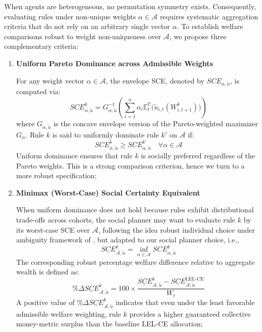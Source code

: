 \documentclass[11pt,a4paper]{article}
\theoremstyle{definition}
\theoremstyle{plain}
\theoremstyle{remark}
\newcommand{\E}{\mathbb{E}}
\renewcommand{\P}{\mathbb{P}}
\newcommand{\1}{\mathbf{1}}
\begin{document}
When agents are heterogeneous, no permutation symmetry exists. Consequently, evaluating rules under non-unique weights $\alpha \in \mathcal{A}$ requires systematic aggregation criteria that do not rely on an arbitrary single vector $\alpha$. To establish welfare comparisons robust to weight non-uniqueness over $\mathcal{A}$, we propose three complementary criteria:
\begin{enumerate}
    \item \textbf{Uniform Pareto Dominance across Admissible Weights}
    
    For any weight vector $\alpha \in \mathcal{A}$, the envelope SCE, denoted by $SCE_{\alpha, \tilde{u}}$, is computed via:
    \begin{equation*}
        SCE_{\alpha, \tilde{u}}^k = G_{\alpha, \tilde{u}}^{-1}\left( \sum_{i=1}^n \alpha_i \E_t^{\P}\big(\tilde{u}_{i,t}(W_{i,t+1}^k)\big) \right)
    \end{equation*}
    where $G_{\alpha, \tilde{u}}$ is the concave envelope version of the Pareto-weighted maximizer $G_{\alpha}$. Rule $k$ is said to uniformly dominate rule $k'$ on $\mathcal{A}$ if:
    \begin{equation*}
        SCE_{\alpha, \tilde{u}}^k \geq SCE_{\alpha, \tilde{u}}^{k'} \quad \forall \alpha \in \mathcal{A}
    \end{equation*}
    Uniform dominance ensures that rule $k$ is socially preferred regardless of the Pareto weights. This is a strong comparison criterion, hence we turn to a more robust specification;
    \item \textbf{Minimax (Worst-Case) Social Certainty Equivalent}
    
    When uniform dominance does not hold because rules exhibit distributional trade-offs across cohorts, the social planner may want to evaluate rule $k$ by its worst-case SCE over $\mathcal{A}$, following the idea robust individual choice under ambiguity framework of \citet{Gilboa_Schmeidler_1989_maxmin}, but adapted to our social planner choice, i.e.,
    \begin{equation}
        \underline{SCE}^{k}_{\mathcal{A}, \tilde{u}} = \inf_{\alpha \in \mathcal{A}} SCE_{\alpha, \tilde{u}}^k
    \end{equation}
    The corresponding robust percentage welfare difference relative to aggregate wealth is defined as:
    \begin{equation*}
        \% \Delta \underline{SCE}^{k}_{\mathcal{A}, \tilde{u}} = 100 \times \frac{\underline{SCE}^{k}_{\mathcal{A}, \tilde{u}} - \underline{SCE}^{\text{LEL-CE}}_{\mathcal{A}, \tilde{u}}}{W_t}
    \end{equation*}
    A positive value of $\% \Delta \underline{SCE}^{k}_{\mathcal{A}, \tilde{u}}$ indicates that even under the least favorable admissible welfare weighting, rule $k$ provides a higher guaranteed collective money-metric surplus than the baseline LEL-CE allocation;


\end{enumerate}
\end{document}
